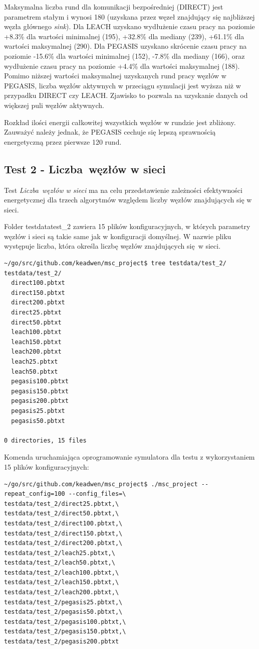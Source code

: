 \documentclass[a4paper,12pt,twoside,openany]{report}
\begin{document}
\par
Maksymalna liczba rund dla komunikacji bezpośredniej (DIRECT) jest parametrem stałym i wynosi 180 (uzyskana przez węzeł znajdujący się najbliższej węzła głównego \textit{sink}).
Dla LEACH uzyskano wydłużenie czasu pracy na poziomie +8.3\% dla wartości minimalnej (195), +32.8\% dla mediany (239), +61.1\% dla wartości maksymalnej (290).
Dla PEGASIS uzyskano skrócenie czasu pracy na poziomie -15.6\% dla wartości minimalnej (152), -7.8\% dla mediany (166), oraz wydłużenie czasu pracy na poziomie +4.4\% dla wartości maksymalnej (188).
Pomimo niższej wartości maksymalnej uzyskanych rund pracy węzłów w PEGASIS, liczba węzłów aktywnych w przeciągu symulacji jest wyższa niż w przypadku DIRECT czy LEACH.
Zjawisko to pozwala na uzyskanie danych od większej puli węzłów aktywnych.
\par
Rozkład ilości energii całkowitej wszystkich węzłów w rundzie jest zbliżony.
Zauważyć należy jednak, że PEGASIS cechuje się lepszą sprawnością energetyczną przez pierwsze 120 rund.

\subsection{Test 2 - Liczba węzłów w sieci}

Test \textit{Liczba węzłów w sieci} ma na celu przedstawienie zależności efektywności energetycznej dla trzech algorytmów względem liczby węzłów znajdujących się w sieci.

Folder testdata\/test\_2 zawiera 15 plików konfiguracyjnych, w których parametry węzłów i sieci są takie same jak w konfiguracji domyślnej.
W nazwie pliku występuje liczba, która określa liczbę węzłów znajdujących się w sieci.

\begin{lstlisting}
~/go/src/github.com/keadwen/msc_project$ tree testdata/test_2/
testdata/test_2/
  direct100.pbtxt
  direct150.pbtxt
  direct200.pbtxt
  direct25.pbtxt
  direct50.pbtxt
  leach100.pbtxt
  leach150.pbtxt
  leach200.pbtxt
  leach25.pbtxt
  leach50.pbtxt
  pegasis100.pbtxt
  pegasis150.pbtxt
  pegasis200.pbtxt
  pegasis25.pbtxt
  pegasis50.pbtxt

0 directories, 15 files
\end{lstlisting}

Komenda uruchamiająca oprogramowanie symulatora dla testu z wykorzystaniem 15 plików konfiguracyjnych:

\begin{lstlisting}
~/go/src/github.com/keadwen/msc_project$ ./msc_project --repeat_config=100 --config_files=\
testdata/test_2/direct25.pbtxt,\
testdata/test_2/direct50.pbtxt,\
testdata/test_2/direct100.pbtxt,\
testdata/test_2/direct150.pbtxt,\
testdata/test_2/direct200.pbtxt,\
testdata/test_2/leach25.pbtxt,\
testdata/test_2/leach50.pbtxt,\
testdata/test_2/leach100.pbtxt,\
testdata/test_2/leach150.pbtxt,\
testdata/test_2/leach200.pbtxt,\
testdata/test_2/pegasis25.pbtxt,\
testdata/test_2/pegasis50.pbtxt,\
testdata/test_2/pegasis100.pbtxt,\
testdata/test_2/pegasis150.pbtxt,\
testdata/test_2/pegasis200.pbtxt
\end{lstlisting}
\end{document}

